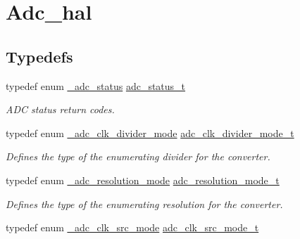 \hypertarget{group__adc__hal}{}\section{Adc\+\_\+hal}
\label{group__adc__hal}
\subsection*{Typedefs}
\begin{DoxyCompactItemize}
\item 
typedef enum \hyperlink{group__adc__hal_ga058351bf32e58c665f0c7869f5cae4eb}{\+\_\+adc\+\_\+status} \hyperlink{group__adc__hal_ga7f25193a4e6a3decc021761ca8b1217a}{adc\+\_\+status\+\_\+t}\hypertarget{group__adc__hal_ga7f25193a4e6a3decc021761ca8b1217a}{}\label{group__adc__hal_ga7f25193a4e6a3decc021761ca8b1217a}

\begin{DoxyCompactList}\small\item\em A\+DC status return codes. \end{DoxyCompactList}\item 
typedef enum \hyperlink{group__adc__hal_gab7c3af47d538315640945a1a90460a08}{\+\_\+adc\+\_\+clk\+\_\+divider\+\_\+mode} \hyperlink{group__adc__hal_ga700d288bd3940e04cbea70bfcfd03da5}{adc\+\_\+clk\+\_\+divider\+\_\+mode\+\_\+t}\hypertarget{group__adc__hal_ga700d288bd3940e04cbea70bfcfd03da5}{}\label{group__adc__hal_ga700d288bd3940e04cbea70bfcfd03da5}

\begin{DoxyCompactList}\small\item\em Defines the type of the enumerating divider for the converter. \end{DoxyCompactList}\item 
typedef enum \hyperlink{group__adc__hal_gaee9345624eca4f249688e14aa9369108}{\+\_\+adc\+\_\+resolution\+\_\+mode} \hyperlink{group__adc__hal_ga08b78c9d8aa89f4b2b6bc9a8e9f37d9f}{adc\+\_\+resolution\+\_\+mode\+\_\+t}\hypertarget{group__adc__hal_ga08b78c9d8aa89f4b2b6bc9a8e9f37d9f}{}\label{group__adc__hal_ga08b78c9d8aa89f4b2b6bc9a8e9f37d9f}

\begin{DoxyCompactList}\small\item\em Defines the type of the enumerating resolution for the converter. \end{DoxyCompactList}\item 
typedef enum \hyperlink{group__adc__hal_ga94a1d7e8db5d03f6dd77cfcf96e3d1f1}{\+\_\+adc\+\_\+clk\+\_\+src\+\_\+mode} \hyperlink{group__adc__hal_ga3c090a2b2a869330ec2b21002da502b5}{adc\+\_\+clk\+\_\+src\+\_\+mode\+\_\+t}\hypertarget{group__adc__hal_ga3c090a2b2a869330ec2b21002da502b5}{}\label{group__adc__hal_ga3c090a2b2a869330ec2b21002da502b5}


\end{DoxyCompactItemize}
